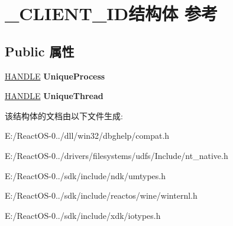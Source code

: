 \hypertarget{struct___c_l_i_e_n_t___i_d}{}\section{\+\_\+\+C\+L\+I\+E\+N\+T\+\_\+\+I\+D结构体 参考}
\label{struct___c_l_i_e_n_t___i_d}
\subsection*{Public 属性}
\begin{DoxyCompactItemize}
\item 
\mbox{\label{struct___c_l_i_e_n_t___i_d_abb0a773960bff0abda53454fd7921a07}} 
\hyperlink{interfacevoid}{H\+A\+N\+D\+LE} {\bfseries Unique\+Process}
\item 
\mbox{\label{struct___c_l_i_e_n_t___i_d_a48899a44b4edcb3f44ccde218a33f35f}} 
\hyperlink{interfacevoid}{H\+A\+N\+D\+LE} {\bfseries Unique\+Thread}
\end{DoxyCompactItemize}


该结构体的文档由以下文件生成\+:\begin{DoxyCompactItemize}
\item 
E\+:/\+React\+O\+S-\/0../dll/win32/dbghelp/compat.\+h\item 
E\+:/\+React\+O\+S-\/0../drivers/filesystems/udfs/\+Include/nt\+\_\+native.\+h\item 
E\+:/\+React\+O\+S-\/0../sdk/include/ndk/umtypes.\+h\item 
E\+:/\+React\+O\+S-\/0../sdk/include/reactos/wine/winternl.\+h\item 
E\+:/\+React\+O\+S-\/0../sdk/include/xdk/iotypes.\+h\end{DoxyCompactItemize}
